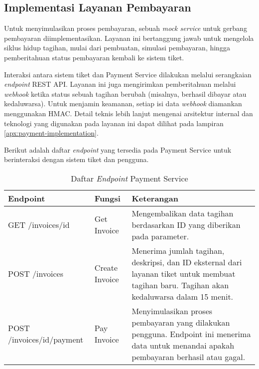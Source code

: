 \subsection{Implementasi Layanan Pembayaran}

Untuk menyimulasikan proses pembayaran, sebuah \textit{mock service} untuk gerbang pembayaran diimplementasikan. Layanan ini bertanggung jawab untuk mengelola siklus hidup tagihan, mulai dari pembuatan, simulasi pembayaran, hingga pemberitahuan status pembayaran kembali ke sistem tiket.

Interaksi antara sistem tiket dan Payment Service dilakukan melalui serangkaian \textit{endpoint} REST API. Layanan ini juga mengirimkan pemberitahuan melalui \textit{webhook} ketika status sebuah tagihan berubah (misalnya, berhasil dibayar atau kedaluwarsa). Untuk menjamin keamanan, setiap isi data \textit{webhook} diamankan menggunakan HMAC. Detail teknis lebih lanjut mengenai arsitektur internal dan teknologi yang digunakan pada layanan ini dapat dilihat pada lampiran \ref{apx:payment-implementation}.

Berikut adalah daftar \textit{endpoint} yang tersedia pada Payment Service untuk berinteraksi dengan sistem tiket dan pengguna.

\begin{table}[h!]
\centering
\caption{Daftar \textit{Endpoint} Payment Service}
\begin{tabular}{|l|l|p{}|}
\hline
\textbf{Endpoint} & \textbf{Fungsi} & \textbf{Keterangan} \\
\hline
GET /invoices/{id} & Get Invoice & Mengembalikan data tagihan berdasarkan ID yang diberikan pada parameter. \\
\hline
POST /invoices & Create Invoice & Menerima jumlah tagihan, deskripsi, dan ID eksternal dari layanan tiket untuk membuat tagihan baru. Tagihan akan kedaluwarsa dalam 15 menit. \\
\hline
POST /invoices/{id}/payment & Pay Invoice & Menyimulasikan proses pembayaran yang dilakukan pengguna. Endpoint ini menerima data untuk menandai apakah pembayaran berhasil atau gagal. \\
\hline
\end{tabular}
\end{table}
